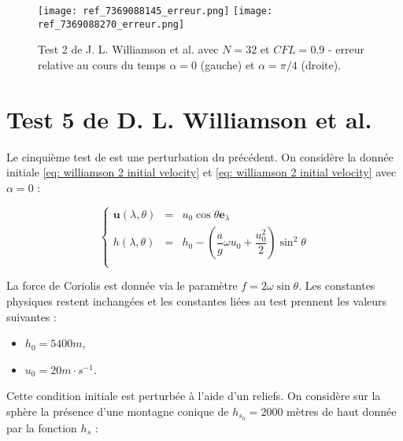 \begin{figure}[ht]
\begin{center}
\texttt{[image: ref\_7369088145\_erreur.png]}
\texttt{[image: ref\_7369088270\_erreur.png]}
\end{center}
\caption{Test 2 de J. L. Williamson et al. \cite{Williamson1992} avec $N=32$ et $CFL=0.9$ - erreur relative au cours du temps $\alpha = 0$ (gauche) et $\alpha = \pi/4$ (droite).}
\label{fig: williamson 2 erreur}
\end{figure}


















\section{Test 5 de D. L. Williamson et al.}

Le cinquième test de \cite{Williamson1992} est une perturbation du précédent.
On considère la donnée initiale \eqref{eq: williamson 2 initial velocity} et \eqref{eq: williamson 2 initial velocity} avec $\alpha = 0$ :

\begin{equation}
\left\lbrace
\begin{array}{rcl}
\mathbf{u}(\lambda, \theta) & = & u_0 \cos \theta \mathbf{e}_{\lambda} \\
h(\lambda, \theta) & = & h_0 - \left( \dfrac{a}{g} \omega u_0 + \dfrac{u_0^2}{2} \right) \sin^2 \theta \\
\end{array}
\right.
\end{equation}

La force de Coriolis est donnée via le paramètre $f = 2 \omega \sin \theta$. Les constantes physiques restent inchangées et les constantes liées au test prennent les valeurs suivantes :

\begin{itemize}
\item $h_0 = 5400 m$,
\item $u_0 = 20 m \cdot s^{-1}$.
\end{itemize}

Cette condition initiale est perturbée à l'aide d'un reliefs.
On considère sur la sphère la présence d'une montagne conique de $h_{s_0} = 2000$ mètres de haut donnée par la fonction $h_s$ :


